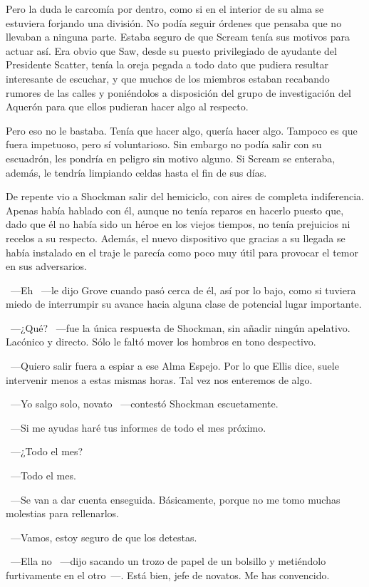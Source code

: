Pero la duda le carcomía por dentro, como si en el interior de su alma se estuviera forjando una división. No podía seguir órdenes que pensaba que no llevaban a ninguna parte. Estaba seguro de que Scream tenía sus motivos para actuar así. Era obvio que Saw, desde su puesto privilegiado de ayudante del Presidente Scatter, tenía la oreja pegada a todo dato que pudiera resultar interesante de escuchar, y que muchos de los miembros estaban recabando rumores de las calles y poniéndolos a disposición del grupo de investigación del Aquerón para que ellos pudieran hacer algo al respecto.

Pero eso no le bastaba. Tenía que hacer algo, quería hacer algo. Tampoco es que fuera impetuoso, pero sí voluntarioso. Sin embargo no podía salir con su escuadrón, les pondría en peligro sin motivo alguno. Si Scream se enteraba, además, le tendría limpiando celdas hasta el fin de sus días.

De repente vio a Shockman salir del hemiciclo, con aires de completa indiferencia. Apenas había hablado con él, aunque no tenía reparos en hacerlo puesto que, dado que él no había sido un héroe en los viejos tiempos, no tenía prejuicios ni recelos a su respecto. Además, el nuevo dispositivo que gracias a su llegada se había instalado en el traje le parecía como poco muy útil para provocar el temor en sus adversarios.

~---Eh ~---le dijo Grove cuando pasó cerca de él, así por lo bajo, como si tuviera miedo de interrumpir su avance hacia alguna clase de potencial lugar importante.

~---¿Qué? ~---fue la única respuesta de Shockman, sin añadir ningún apelativo. Lacónico y directo. Sólo le faltó mover los hombros en tono despectivo.

~---Quiero salir fuera a espiar a ese Alma Espejo. Por lo que Ellis dice, suele intervenir menos a estas mismas horas. Tal vez nos enteremos de algo.

~---Yo salgo solo, novato ~---contestó Shockman escuetamente.

~---Si me ayudas haré tus informes de todo el mes próximo.

~---¿Todo el mes?

~---Todo el mes.

~---Se van a dar cuenta enseguida. Básicamente, porque no me tomo muchas molestias para rellenarlos.

~---Vamos, estoy seguro de que los detestas.

~---Ella no ~---dijo sacando un trozo de papel de un bolsillo y metiéndolo furtivamente en el otro~---. Está bien, jefe de novatos. Me has convencido.

